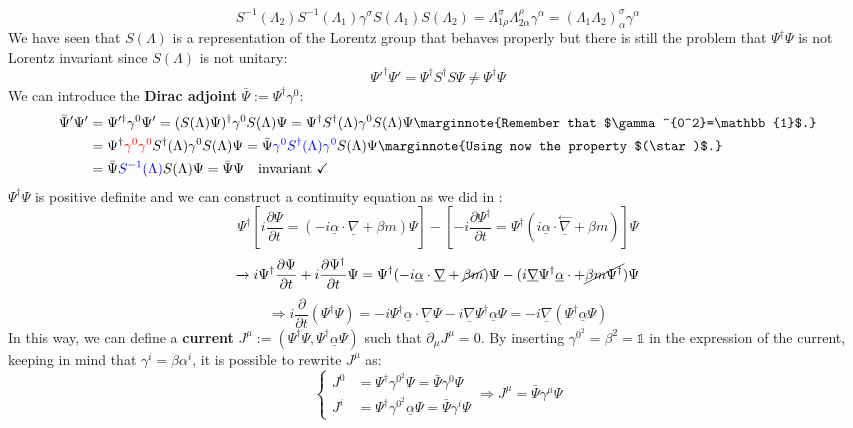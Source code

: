 \documentclass[../main.tex]{subfiles}
\begin{document}
\[
S^{-1}(\Lambda_2)S^{-1}(\Lambda_1)\gamma^\sigma S(\Lambda_1)S(\Lambda_2)=\Lambda^\sigma_{1\rho}\Lambda^\rho_{2\alpha}\gamma^\alpha=(\Lambda_1\Lambda_2)^\sigma_\alpha\gamma^\alpha
\]
We have seen that $S(\Lambda)$ is a representation of the Lorentz group that behaves properly but there is still the problem that $\Psi^\dagger\Psi$ is not Lorentz invariant since $S(\Lambda)$ is not unitary:
\[
\Psi'^\dagger\Psi'=\Psi^\dagger S^\dagger S\Psi\neq\Psi^\dagger\Psi
\]
We can introduce the \textbf{Dirac adjoint} $\bar{\Psi}:=\Psi^\dagger\gamma^0$:
\begin{align*}
\bar{\Psi}'\Psi'&=\Psi'^\dagger\gamma^0\Psi'=(S(\Lambda)\Psi)^\dagger\gamma^0S(\Lambda)\Psi=\Psi^\dagger S^\dagger(\Lambda)\gamma^0S(\Lambda)\Psi\marginnote{Remember that $\gamma^{0^2}=\mathbb{1}$.}\\
&=\Psi^\dagger{\color{red}\gamma^0\gamma^0}S^\dagger(\Lambda)\gamma^0S(\Lambda)\Psi=\bar{\Psi}{\color{blue}\gamma^0S^\dagger(\Lambda)\gamma^0}S(\Lambda)\Psi\marginnote{Using now the property $(\star)$.}\\
&=\bar{\Psi}{\color{blue}S^{-1}(\Lambda)}S(\Lambda)\Psi=\bar{\Psi}\Psi \quad \text{invariant \checkmark}
\end{align*}
$\Psi^\dagger\Psi$ is positive definite and we can construct a continuity equation as we did in :
\[
\Psi^\dagger\left[i\frac{\partial\Psi}{\partial t}=(-i\underline{\alpha}\cdot\underline{\nabla}+\beta m)\Psi\right]-\left[-i\frac{\partial\Psi^\dagger}{\partial t}=\Psi^\dagger(i\underline{\alpha}\cdot\overset{\leftarrow}{\underline{\nabla}}+\beta m)\right]\Psi
\]
\[
\xrightarrow[]{}i\Psi^\dagger\frac{\partial\Psi}{\partial t}+i\frac{\partial\Psi^\dagger}{\partial t}\Psi=\Psi^\dagger(-i\underline{\alpha}\cdot\underline{\nabla}+\cancel{\beta m})\Psi-(i\underline{\nabla}\Psi^\dagger\underline{\alpha}\cdot+\cancel{\beta m\Psi^\dagger} )\Psi
\]
\[
\Rightarrow i\frac{\partial}{\partial t}(\Psi^\dagger\Psi)=-i\Psi^\dagger\underline{\alpha}\cdot\underline{\nabla}\Psi-i\underline{\nabla}\Psi^\dagger\underline{\alpha}\Psi=-i\underline{\nabla}(\Psi^\dagger\underline{\alpha}\Psi)
\]
In this way, we can define a \textbf{current} $J^\mu:=(\Psi^\dagger\Psi,\Psi^\dagger\underline{\alpha}\Psi)$ such that $\partial_\mu J^\mu=0$. By inserting $\gamma^{0^2}=\beta^2=\mathbb{1}$ in the expression of the current, keeping in mind that $\gamma^i=\beta\alpha^i$, it is possible to rewrite $J^\mu$ as:
\[
\left\{
\begin{aligned}
J^0&=\Psi^\dagger\gamma^{0^2}\Psi=\bar{\Psi}\gamma^0\Psi\\
J^i&=\Psi^\dagger\gamma^{0^2}\underline{\alpha}\Psi=\bar{\Psi}\gamma^i\Psi
\end{aligned}
\right.
\Rightarrow J^\mu=\bar{\Psi}\gamma^\mu\Psi
\]
\end{document}
